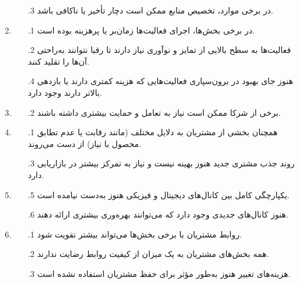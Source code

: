 \documentclass[dvipsnames, svgnames, x11names, 11pt]{article}
\begin{document}
\begin{enumerate}
\begin{itemize}
\item[\theenumi$.$3]
در برخی موارد، تخصیص منابع ممکن است دچار تأخیر یا ناکافی باشد.
\end{itemize}

\item {}
\begin{itemize}
\item[\theenumi$.$1]
در برخی بخش‌ها، اجرای فعالیت‌ها زمان‌بر یا پرهزینه بوده است.

\item[\theenumi$.$2]
فعالیت‌ها به سطح بالایی از تمایز و نوآوری نیاز دارند تا رقبا نتوانند به‌راحتی آن‌ها را تقلید کنند.

\item[\theenumi$.$4]
هنوز جای بهبود در برون‌سپاری فعالیت‌هایی که هزینه کمتری دارند یا بازدهی بالاتر دارند وجود دارد.

\end{itemize}

\item {}
\begin{itemize}
\item[\theenumi$.$2]
برخی از شرکا ممکن است نیاز به تعامل و حمایت بیشتری داشته باشند.
\end{itemize}

\item {}
\begin{itemize}
\item[\theenumi$.$1]
همچنان بخشی از مشتریان به دلایل مختلف (مانند رقابت یا عدم تطابق محصول با نیاز) از دست می‌روند.

\item[\theenumi$.$3]
روند جذب مشتری جدید هنوز بهینه نیست و نیاز به تمرکز بیشتر در بازاریابی دارد.
\end{itemize}

\item {}
\begin{itemize}
\item[\theenumi$.$5]
یکپارچگی کامل بین کانال‌های دیجیتال و فیزیکی هنوز به‌دست نیامده است.

\item[\theenumi$.$6]
هنوز کانال‌های جدیدی وجود دارد که می‌توانند بهره‌وری بیشتری ارائه دهند.
\end{itemize}

\item {}
\begin{itemize}
\item[\theenumi$.$1]
روابط مشتریان با برخی بخش‌ها می‌تواند بیشتر تقویت شود.

\item[\theenumi$.$2]
همه بخش‌های مشتریان به یک میزان از کیفیت روابط رضایت ندارند.

\item[\theenumi$.$3]
هزینه‌های تغییر هنوز به‌طور مؤثر برای حفظ مشتریان استفاده نشده است.
\end{itemize}

\end{enumerate}
\end{document}
